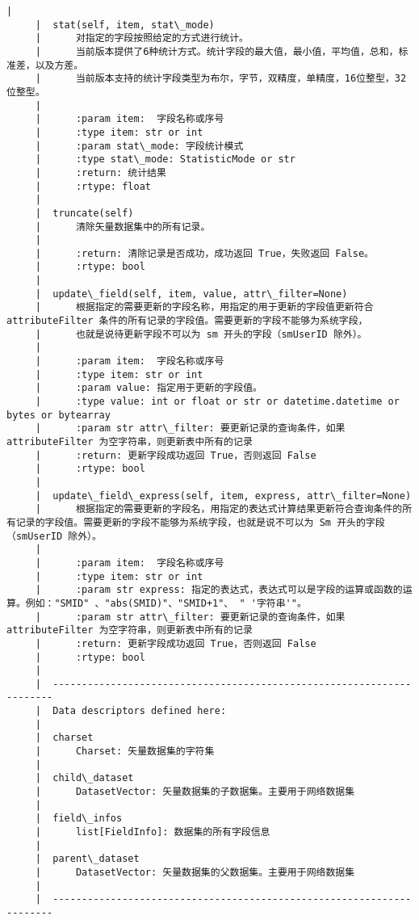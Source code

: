 \documentclass[11pt]{article}
\begin{document}
\begin{Verbatim}[commandchars=\\\{\}]
     |  
     |  stat(self, item, stat\_mode)
     |      对指定的字段按照给定的方式进行统计。
     |      当前版本提供了6种统计方式。统计字段的最大值，最小值，平均值，总和，标准差，以及方差。
     |      当前版本支持的统计字段类型为布尔，字节，双精度，单精度，16位整型，32位整型。
     |      
     |      :param item:  字段名称或序号
     |      :type item: str or int
     |      :param stat\_mode: 字段统计模式
     |      :type stat\_mode: StatisticMode or str
     |      :return: 统计结果
     |      :rtype: float
     |  
     |  truncate(self)
     |      清除矢量数据集中的所有记录。
     |      
     |      :return: 清除记录是否成功，成功返回 True，失败返回 False。
     |      :rtype: bool
     |  
     |  update\_field(self, item, value, attr\_filter=None)
     |      根据指定的需要更新的字段名称，用指定的用于更新的字段值更新符合 attributeFilter 条件的所有记录的字段值。需要更新的字段不能够为系统字段，
     |      也就是说待更新字段不可以为 sm 开头的字段（smUserID 除外）。
     |      
     |      :param item:  字段名称或序号
     |      :type item: str or int
     |      :param value: 指定用于更新的字段值。
     |      :type value: int or float or str or datetime.datetime or bytes or bytearray
     |      :param str attr\_filter: 要更新记录的查询条件，如果 attributeFilter 为空字符串，则更新表中所有的记录
     |      :return: 更新字段成功返回 True，否则返回 False
     |      :rtype: bool
     |  
     |  update\_field\_express(self, item, express, attr\_filter=None)
     |      根据指定的需要更新的字段名，用指定的表达式计算结果更新符合查询条件的所有记录的字段值。需要更新的字段不能够为系统字段，也就是说不可以为 Sm 开头的字段（smUserID 除外）。
     |      
     |      :param item:  字段名称或序号
     |      :type item: str or int
     |      :param str express: 指定的表达式，表达式可以是字段的运算或函数的运算。例如："SMID" 、"abs(SMID)"、"SMID+1"、 " '字符串'"。
     |      :param str attr\_filter: 要更新记录的查询条件，如果 attributeFilter 为空字符串，则更新表中所有的记录
     |      :return: 更新字段成功返回 True，否则返回 False
     |      :rtype: bool
     |  
     |  ----------------------------------------------------------------------
     |  Data descriptors defined here:
     |  
     |  charset
     |      Charset: 矢量数据集的字符集
     |  
     |  child\_dataset
     |      DatasetVector: 矢量数据集的子数据集。主要用于网络数据集
     |  
     |  field\_infos
     |      list[FieldInfo]: 数据集的所有字段信息
     |  
     |  parent\_dataset
     |      DatasetVector: 矢量数据集的父数据集。主要用于网络数据集
     |  
     |  ----------------------------------------------------------------------

\end{Verbatim}
\end{document}
